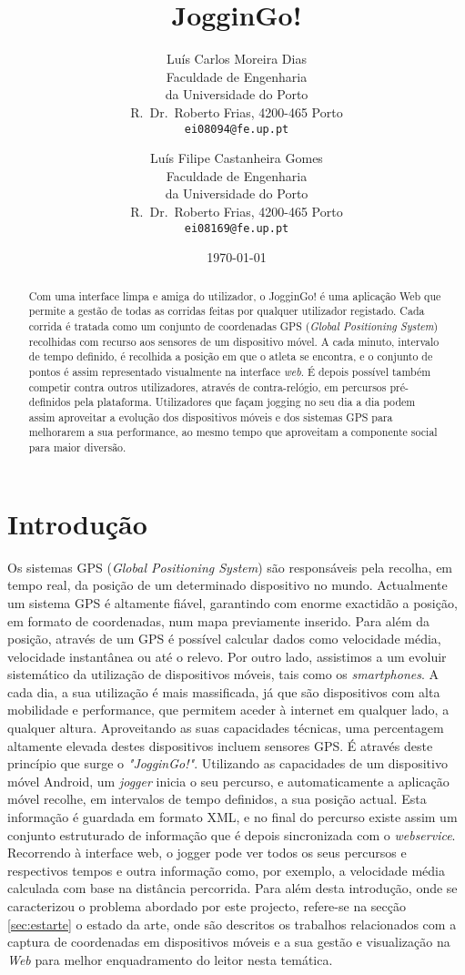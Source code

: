 \documentclass[twocolumn,twoside,10pt,a4paper]{article}
\title{JogginGo! }
\author{Luís Carlos Moreira Dias\\
\small Faculdade de Engenharia\\[-0.8ex]
\small da Universidade do Porto\\[-0.8ex]
\small R.\ Dr.\ Roberto Frias, 4200-465 Porto\\[-0.8ex]
\small \texttt{ei08094@fe.up.pt}\\
\and
Luís Filipe Castanheira Gomes\\
\small Faculdade de Engenharia\\[-0.8ex]
\small da Universidade do Porto\\[-0.8ex]
\small R.\ Dr.\ Roberto Frias, 4200-465 Porto\\[-0.8ex]
\small \texttt{ei08169@fe.up.pt}
}
\date{\today}
\begin{document}
\maketitle
\thispagestyle{plain} 

\begin{abstract}
Com uma interface limpa e amiga do utilizador, o JogginGo! é uma aplicação Web que permite a gestão de todas as corridas feitas por qualquer utilizador registado. Cada corrida é tratada como um conjunto de coordenadas GPS (\textit{Global Positioning System}) recolhidas com recurso aos sensores de um dispositivo móvel. A cada minuto, intervalo de tempo definido, é recolhida a posição em que o atleta se encontra, e o conjunto de pontos é assim representado visualmente na interface \textit{web}. É depois possível também competir contra outros utilizadores, através de contra-relógio, em percursos pré-definidos pela plataforma. Utilizadores que façam jogging no seu dia a dia podem assim aproveitar a evolução dos dispositivos móveis e dos sistemas GPS para melhorarem a sua performance, ao mesmo tempo que aproveitam a componente social para maior diversão.
\end{abstract}

\section{Introdução}\label{sec:intro}

Os sistemas GPS (\emph{Global Positioning System}) são responsáveis pela recolha, em tempo real, da posição de um determinado dispositivo no mundo. Actualmente um sistema GPS é altamente fiável, garantindo com enorme exactidão a posição, em formato de coordenadas, num mapa previamente inserido. Para além da posição, através de um GPS é possível calcular dados como velocidade média, velocidade instantânea ou até o relevo.
Por outro lado, assistimos a um evoluir sistemático da utilização de dispositivos móveis, tais como os \emph{smartphones}. A cada dia, a sua utilização é mais massificada, já que são dispositivos com alta mobilidade e performance, que permitem aceder à internet em qualquer lado, a qualquer altura. Aproveitando as suas capacidades técnicas, uma percentagem altamente elevada destes dispositivos incluem sensores GPS. 
É através deste princípio que surge o \textit{"JogginGo!"}. Utilizando as capacidades de um dispositivo móvel Android, um \emph{jogger} inicia o seu percurso, e automaticamente a aplicação móvel recolhe, em intervalos de tempo definidos, a sua posição actual. Esta informação é guardada em formato XML, e no final do percurso existe assim um conjunto estruturado de informação que é depois sincronizada com o \emph{webservice}. Recorrendo à interface web, o jogger pode ver todos os seus percursos e respectivos tempos e outra informação como, por exemplo, a velocidade média calculada com base na distância percorrida.
Para além desta introdução, onde se caracterizou o problema abordado
por este projecto, refere-se na secção \ref{sec:estarte} o
estado da arte, onde são descritos os trabalhos relacionados com a
captura de coordenadas em dispositivos móveis e a sua gestão e visualização na \textit{Web} para melhor enquadramento do leitor nesta temática. 
\end{document}
